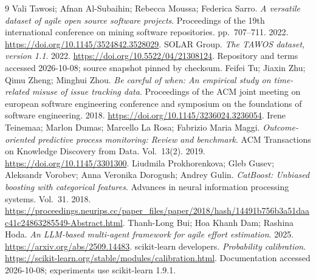 \begin{thebibliography}{9}
 Vali Tawosi; Afnan Al-Subaihin; Rebecca Moussa; Federica Sarro. \emph{A versatile dataset of agile open source software projects}. Proceedings of the 19th international conference on mining software repositories. pp.~707--711. 2022. \url{https://doi.org/10.1145/3524842.3528029}.
 SOLAR Group. \emph{The TAWOS dataset, version 1.1}. 2022. \url{https://doi.org/10.5522/04/21308124}. Repository and terms accessed 2026-10-08; source snapshot pinned by checksum.
 Feifei Tu; Jiaxin Zhu; Qimu Zheng; Minghui Zhou. \emph{Be careful of when: An empirical study on time-related misuse of issue tracking data}. Proceedings of the ACM joint meeting on european software engineering conference and symposium on the foundations of software engineering. 2018. \url{https://doi.org/10.1145/3236024.3236054}.
 Irene Teinemaa; Marlon Dumas; Marcello La Rosa; Fabrizio Maria Maggi. \emph{Outcome-oriented predictive process monitoring: Review and benchmark}. ACM Transactions on Knowledge Discovery from Data. Vol.~13(2). 2019. \url{https://doi.org/10.1145/3301300}.
 Liudmila Prokhorenkova; Gleb Gusev; Aleksandr Vorobev; Anna Veronika Dorogush; Andrey Gulin. \emph{CatBoost: Unbiased boosting with categorical features}. Advances in neural information processing systems. Vol.~31. 2018. \url{https://proceedings.neurips.cc/paper_files/paper/2018/hash/14491b756b3a51daac41c24863285549-Abstract.html}.
 Thanh-Long Bui; Hoa Khanh Dam; Rashina Hoda. \emph{An LLM-based multi-agent framework for agile effort estimation}. 2025. \url{https://arxiv.org/abs/2509.14483}.
 scikit-learn developers. \emph{Probability calibration}. \url{https://scikit-learn.org/stable/modules/calibration.html}. Documentation accessed 2026-10-08; experiments use scikit-learn 1.9.1.
\end{thebibliography}

